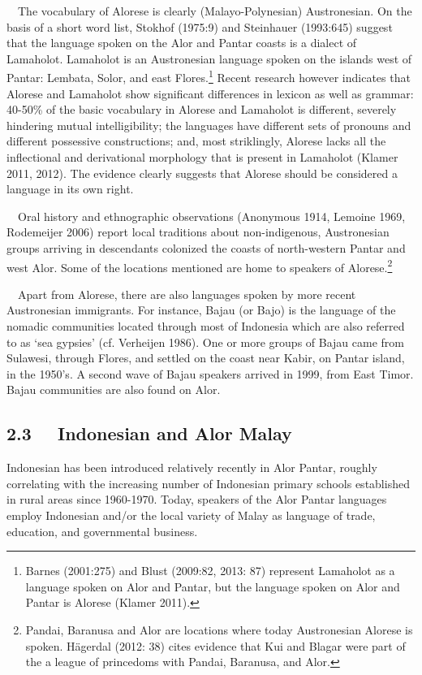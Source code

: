 \ \ The vocabulary of Alorese is clearly (Malayo-Polynesian) Austronesian. On the basis of a short word list, Stokhof (1975:9) and Steinhauer (1993:645) suggest that the language spoken on the Alor and Pantar coasts is a dialect of Lamaholot. Lamaholot is an Austronesian language spoken on the islands west of Pantar: Lembata, Solor, and east Flores.\footnote{Barnes (2001:275) and Blust (2009:82, 2013: 87) represent Lamaholot as a language spoken on Alor and Pantar, but the language spoken on Alor and Pantar is Alorese (Klamer 2011).} Recent research however indicates that Alorese and Lamaholot show significant differences in lexicon as well as grammar: 40-50\% of the basic vocabulary in Alorese and Lamaholot is different, severely hindering mutual intelligibility; the languages have different sets of pronouns and different possessive constructions; and, most striklingly, Alorese lacks all the inflectional and derivational morphology that is present in Lamaholot (Klamer 2011, 2012). The evidence clearly 
suggests that Alorese should be considered a language in its own right. 

\ \ Oral history and ethnographic observations (Anonymous 1914, Lemoine 1969, Rodemeijer 2006) report local traditions about non-indigenous, Austronesian groups arriving in descendants colonized the coasts of north-western Pantar and west Alor. Some of the locations mentioned are home to speakers of Alorese.\footnote{Pandai, Baranusa and Alor are locations where today Austronesian Alorese is spoken. H\"agerdal (2012: 38) cites evidence that Kui and Blagar were part of the a league of princedoms with Pandai, Baranusa, and Alor. }\ \  

\ \ Apart from Alorese, there are also languages spoken by more recent Austronesian immigrants. For instance, Bajau (or Bajo) is the language of the nomadic communities located through most of Indonesia which are also referred to as {\textquoteleft}sea gypsies{\textquoteright} (cf. Verheijen 1986). One or more groups of Bajau came from Sulawesi, through Flores, and settled on the coast near Kabir, on Pantar island, in the 1950{\textquoteright}s. A second wave of Bajau speakers arrived in 1999, from East Timor. Bajau communities are also found on Alor. 

\subsection[2.3 \ \ Indonesian and Alor Malay]{2.3 \ \ Indonesian and Alor Malay}
Indonesian has been introduced relatively recently in Alor Pantar, roughly correlating with the increasing number of Indonesian primary schools established in rural areas since 1960-1970. Today, speakers of the Alor Pantar languages employ Indonesian and/or the local variety of Malay as language of trade, education, and governmental business. 

